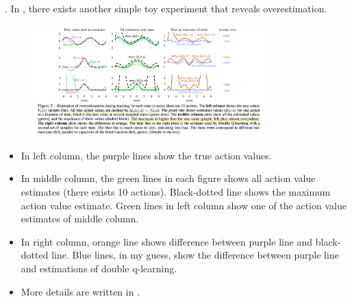 \documentclass[8pt]{beamer}
\begin{document}
\begin{frame}{.}
    In \cite{van2016deep}, there exists another simple toy experiment that reveals overestimation.

    \begin{figure}
        \includegraphics[width=0.8\textwidth]{Figure2.png}
    \end{figure}

    \begin{itemize}
        \item In left column, the purple lines show the true action values.
        \item In middle column, the green lines in each figure shows all action value estimates (there exists 10 actions).
        Black-dotted line shows the maximum action value estimate.
        Green lines in left column show one of the action value estimates of middle column.
        \item In right column, orange line shows difference between purple line and black-dotted line.
        Blue lines, in my guess, show the difference between purple line and estimations of double q-learning.
        \item More details are written in \cite{van2016deep}.
    \end{itemize}
\end{frame}
\end{document}
